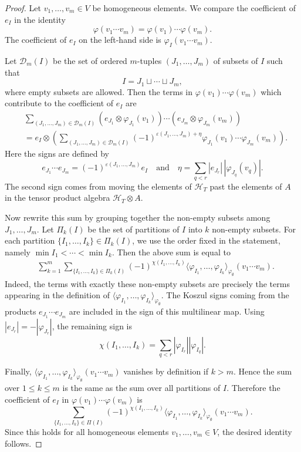 \documentclass[a4paper,10pt]{amsart}
\theoremstyle{definition}
\theoremstyle{remark}
\numberwithin{equation}{section}
\begin{document}
\begin{proof}
Let $v_1,\ldots,v_m\in V$ be homogeneous elements. We compare the
coefficient of $e_I$ in the identity
\[
        \varphi(v_1\cdots v_m)
        =
        \varphi(v_1)\cdots \varphi(v_m).
\]
The coefficient of $e_I$ on the left-hand side is
$\varphi_I(v_1\cdots v_m)$.

Let $\mathcal D_m(I)$ be the set of ordered $m$-tuples
$(J_1,\ldots,J_m)$ of subsets of $I$ such that
\[
        I=J_1\sqcup\cdots\sqcup J_m,
\]
where empty subsets are allowed. Then the terms in
$\varphi(v_1)\cdots\varphi(v_m)$ which contribute to the coefficient of
$e_I$ are
\begin{align*}
&\sum_{(J_1,\ldots,J_m)\in \mathcal D_m(I)}
(e_{J_1}\otimes \varphi_{J_1}(v_1))
\cdots
(e_{J_m}\otimes \varphi_{J_m}(v_m))                       \\
&=
e_I\otimes
\left(
\sum_{(J_1,\ldots,J_m)\in \mathcal D_m(I)}
(-1)^{\varepsilon(J_1,\ldots,J_m)+\eta}
\varphi_{J_1}(v_1)\cdots\varphi_{J_m}(v_m)
\right).
\end{align*}
Here the signs are defined by
\[
        e_{J_1}\cdots e_{J_m}
        =
        (-1)^{\varepsilon(J_1,\ldots,J_m)}e_I
\quad
\text{and}
\quad
        \eta
        =
        \sum_{q<r}|e_{J_r}|\,
        |\varphi_{J_q}(v_q)|.
\]
The second sign comes from moving the elements of $\mathcal H_T$ past the
elements of $A$ in the tensor product algebra $\mathcal H_T\otimes A$.

Now rewrite this sum by grouping together the non-empty subsets among
$J_1,\ldots,J_m$. Let $\Pi_k(I)$ be the set of partitions of $I$ into
$k$ non-empty subsets. For each partition
$\{I_1,\ldots,I_k\}\in \Pi_k(I)$, we use the order fixed in the statement,
namely
$
\min I_1<\cdots<\min I_k.
$
Then the above sum is equal to
\begin{align*}
&\sum_{k=1}^m
\sum_{\{I_1,\ldots,I_k\}\in \Pi_k(I)}
(-1)^{\chi(I_1,\ldots,I_k)}
\langle
\varphi_{I_1},\ldots,\varphi_{I_k}
\rangle_{\varphi_{\emptyset}}
(v_1\cdots v_m).
\end{align*}
Indeed, the terms with exactly these non-empty subsets are precisely the
terms appearing in the definition of
$
\langle
\varphi_{I_1},\ldots,\varphi_{I_k}
\rangle_{\varphi_{\emptyset}}.
$
The Koszul signs coming from the products
$e_{J_1}\cdots e_{J_m}$ are included in the sign of this multilinear map.
Using $|e_{J_r}|=-|\varphi_{J_r}|$, the remaining sign is
\[
        \chi(I_1,\ldots,I_k)
        =
        \sum_{q<r}|\varphi_{I_r}||\varphi_{I_q}|.
\]

Finally,
$
\langle
\varphi_{I_1},\ldots,\varphi_{I_k}
\rangle_{\varphi_{\emptyset}}
(v_1\cdots v_m)
$
vanishes by definition if $k>m$. Hence the sum over $1\leq k\leq m$ is the
same as the sum over all partitions of $I$. Therefore the coefficient of
$e_I$ in $\varphi(v_1)\cdots\varphi(v_m)$ is
\[
\sum_{\{I_1,\ldots,I_k\}\in \Pi(I)}
(-1)^{\chi(I_1,\ldots,I_k)}
\langle
\varphi_{I_1},\ldots,\varphi_{I_k}
\rangle_{\varphi_{\emptyset}}
(v_1\cdots v_m).
\]
Since this holds for all homogeneous elements $v_1,\ldots,v_m\in V$, the
desired identity follows.
\end{proof}
\end{document}
